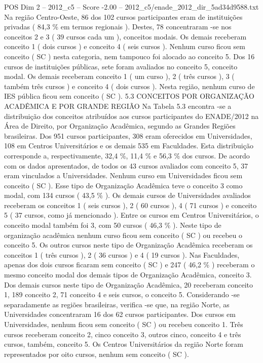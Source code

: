 \begin{textsample}{POS Dim 2 – 2012\_c5 – Score -2.00 – 2012\_c5/enade\_2012\_dir\_5ad34d9588.txt}
Na região Centro-Oeste, 86 dos 102 cursos participantes eram de instituições privadas ( 84,3 \% em termos regionais ).
Destes, 78 concentraram -se nos conceitos 2 e 3 ( 39 cursos cada um ), conceitos modais.
Os demais receberam conceito 1 ( dois cursos ) e conceito 4 ( seis cursos ).
Nenhum curso ficou sem conceito ( SC ) nesta categoria, nem tampouco foi alocado ao conceito 5.
Dos 16 cursos de instituições públicas, sete foram avaliados no conceito 5, conceito modal.
Os demais receberam conceito 1 ( um curso ), 2 ( três cursos ), 3 ( também três cursos ) e conceito 4 ( dois cursos ).
Nesta região, nenhum curso de IES pública ficou sem conceito ( SC ). 5.3 CONCEITOS POR ORGANIZAÇÃO ACADÊMICA E POR GRANDE REGIÃO Na Tabela 5.3 encontra -se a distribuição dos conceitos atribuídos aos cursos participantes do ENADE/2012 na Área de Direito, por Organização Acadêmica, segundo as Grandes Regiões brasileiras.
Dos 951 cursos participantes, 308 eram oferecidos em Universidades, 108 em Centros Universitários e os demais 535 em Faculdades.
Esta distribuição corresponde a, respectivamente, 32,4 \%, 11,4 \% e 56,3 \% dos cursos.
De acordo com os dados apresentados, de todos os 43 cursos avaliados com conceito 5, 37 eram vinculados a Universidades.
Nenhum curso em Universidades ficou sem conceito ( SC ).
Esse tipo de Organização Acadêmica teve o conceito 3 como modal, com 134 cursos ( 43,5 \% ).
Os demais cursos de Universidades avaliados receberam os conceitos 1 ( seis cursos ), 2 ( 60 cursos ), 4 ( 71 cursos ) e conceito 5 ( 37 cursos, como já mencionado ).
Entre os cursos em Centros Universitários, o conceito modal também foi 3, com 50 cursos ( 46,3 \% ).
Neste tipo de organização acadêmica nenhum curso ficou sem conceito ( SC ) ou recebeu o conceito 5.
Os outros cursos neste tipo de Organização Acadêmica receberam os conceitos 1 ( três cursos ), 2 ( 36 cursos ) e 4 ( 19 cursos ).
Nas Faculdades, apenas dos dois cursos ficaram sem conceito ( SC ) e 247 ( 46,2 \% ) receberam o mesmo conceito modal dos demais tipos de Organização Acadêmica, conceito 3.
Dos demais cursos neste tipo de Organização Acadêmica, 20 receberam conceito 1, 189 conceito 2, 71 conceito 4 e seis cursos, o conceito 5.
Considerando -se separadamente as regiões brasileiras, verifica -se que, na região Norte, as Universidades concentraram 16 dos 62 cursos participantes.
Dos cursos em Universidades, nenhum ficou sem conceito ( SC ) ou recebeu conceito 1.
Três cursos receberam conceito 2, cinco conceito 3, outros cinco, conceito 4 e três cursos, também, conceito 5.
Os Centros Universitários da região Norte foram representados por oito cursos, nenhum sem conceito ( SC ).

\end{textsample}
